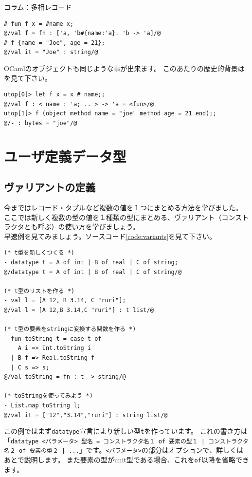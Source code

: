 \documentclass[11pt,a4paper]{article}
\begin{document}
\begin{itembox}[l]{コラム：多相レコード}
\begin{lstlisting}[caption=SML\#の多相レコード,label=code:poly-record]
# fun f x = #name x;
@/val f = fn : ['a, 'b#{name:'a}. 'b -> 'a]/@
# f {name = "Joe", age = 21};
@/val it = "Joe" : string/@
\end{lstlisting}

  OCamlのオブジェクトも同じような事が出来ます。
  このあたりの歴史的背景は\cite{smlsharp:bg-of-poly-record}を見て下さい。

\begin{lstlisting}[caption=OCamlのオブジェクト,label=code:ocaml-obj]
utop[0]> let f x = x # name;;
@/val f : < name : 'a; .. > -> 'a = <fun>/@
utop[1]> f (object method name = "joe" method age = 21 end);;
@/- : bytes = "joe"/@
\end{lstlisting}

\end{itembox}

\section{ユーザ定義データ型}
\subsection{ヴァリアントの定義}

今まではレコード・タプルなど複数の値を１つにまとめる方法を学びました。
ここでは新しく複数の型の値を１種類の型にまとめる、ヴァリアント（コンストラクタとも呼ぶ）の使い方を学びましょう。\\
早速例を見てみましょう。ソースコード\ref{code:variants}を見て下さい。

\begin{lstlisting}[caption=単純なヴァリアント,label=code:variants]
(* t型を新しくつくる *)
- datatype t = A of int | B of real | C of string;
@/datatype t = A of int | B of real | C of string/@

(* t型のリストを作る *)
- val l = [A 12, B 3.14, C "ruri"];
@/val l = [A 12,B 3.14,C "ruri"] : t list/@

(* t型の要素をstringに変換する関数を作る *)
- fun toString t = case t of
    A i => Int.toString i
  | B f => Real.toString f
  | C s => s;
@/val toString = fn : t -> string/@

(* toStringを使ってみよう *)
- List.map toString l;
@/val it = ["12","3.14","ruri"] : string list/@
\end{lstlisting}

この例ではまず\lstinline{datatype}宣言により新しい型\lstinline{t}を作っています。
これの書き方は「\lstinline{datatype <パラメータ> 型名 = コンストラクタ名１ of 要素の型１ | コンストラクタ名２ of 要素の型２ | ...}」です。\lstinline{<パラメータ>}の部分はオプションで、詳しくはあとで説明します。
また要素の型がunit型である場合、これを\lstinline{of}以降を省略できます。
\end{document}
